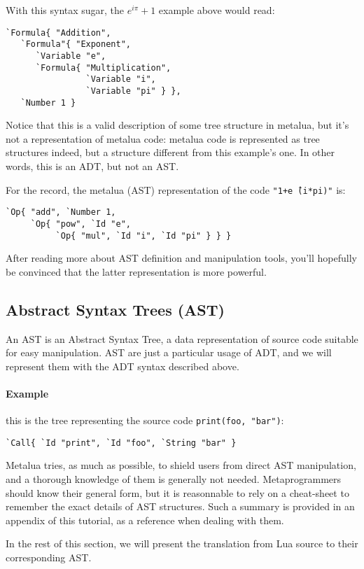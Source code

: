 With this syntax sugar, the $e^{i\pi}+1$ example above would read:
\begin{verbatim}
`Formula{ "Addition",
   `Formula"{ "Exponent",
      `Variable "e",
      `Formula{ "Multiplication",
                `Variable "i",
                `Variable "pi" } },
   `Number 1 }
\end{verbatim}

Notice that this is a valid description of some tree structure in metalua, but
it's not a representation of metalua code: metalua code is represented as tree
structures indeed, but a structure different from this example's one. In other
words, this is an ADT, but not an AST.

For the record, the metalua (AST) representation of the code {\tt"1+e\^\ (i*pi)"}
is:
\begin{verbatim}
`Op{ "add", `Number 1,
     `Op{ "pow", `Id "e",
          `Op{ "mul", `Id "i", `Id "pi" } } }
\end{verbatim}

After reading more about AST definition and manipulation tools, you'll hopefully
be convinced that the latter representation is more powerful.

\subsection{Abstract Syntax Trees (AST)}

An AST is an Abstract Syntax Tree, a data representation of source
code suitable for easy manipulation. AST are just a particular usage
of ADT, and we will represent them with the ADT syntax described
above.

\paragraph{Example} this is the tree representing the source code
\verb+print(foo, "bar")+:

\verb+`Call{ `Id "print", `Id "foo", `String "bar" }+

Metalua tries, as much as possible, to shield users from direct AST
manipulation, and a thorough knowledge of them is generally not
needed. Metaprogrammers should know their general form, but it is
reasonnable to rely on a cheat-sheet to remember the exact details of
AST structures. Such a summary is provided
in an appendix of this tutorial, as a reference when dealing with them.

In the rest of this section, we will present the translation from Lua
source to their corresponding AST.

